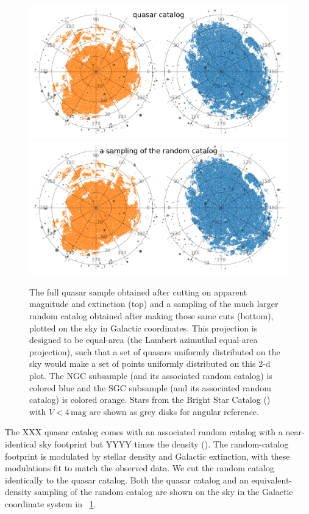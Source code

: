 \documentclass[modern]{aastex631}
\newlength{\figurewidth}
\newcommand{\unit}[1]{\mathrm{#1}}
\newcommand{\mg}{\unit{mag}}
\newcommand{\figref}[1]{\figurename~\ref{#1}}
\begin{document}
\begin{figure}[t!]
  \begin{mdframed}
  \color{captiongray}
  \begin{center}
    \includegraphics[width=\figurewidth]{notebooks/lb.png}\\
    \includegraphics[width=\figurewidth]{notebooks/lb_random.png}
  \end{center}
    \caption{The full quasar sample obtained after cutting on apparent magnitude and extinction (top) and a sampling of the much larger random catalog obtained after making those same cuts (bottom), plotted on the sky in Galactic coordinates.
    This projection is designed to be equal-area (the Lambert azimuthal equal-area projection), such that a set of quasars uniformly distributed on the sky would make a set of points uniformly distributed on this 2-d plot.
    The NGC subsample (and its associated random catalog) is colored blue and the SGC subsample (and its associated random catalog) is colored orange.
    Stars from the Bright Star Catalog (\citealt{bsc}) with $V<4\,\mg$ are shown as grey disks for angular reference.\label{fig:lb}}
  \end{mdframed}
\end{figure}
The XXX quasar catalog comes with an associated random catalog with a near-identical sky footprint but YYYY times the density (\citealt{ksf}).
The random-catalog footprint is modulated by stellar density and Galactic extinction, with these modulations fit to match the observed data.
We cut the random catalog identically to the quasar catalog.
Both the quasar catalog and an equivalent-density sampling of the random catalog are shown on the sky in the Galactic coordinate system in \figref{fig:lb}.
\end{document}
